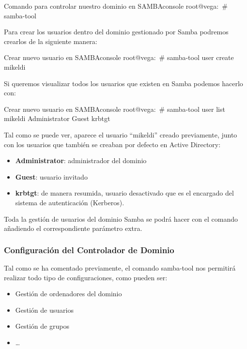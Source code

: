 \begin{mycode}{Comando para controlar nuestro dominio en SAMBA}{console}{}
root@vega:~# samba-tool
\end{mycode}

Para crear los usuarios dentro del dominio gestionado por Samba podremos crearlos de la siguiente manera:

\begin{mycode}{Crear nuevo usuario en SAMBA}{console}{}
root@vega:~# samba-tool user create mikeldi
\end{mycode}

Si queremos visualizar todos los usuarios que existen en Samba podemos hacerlo con:

\begin{mycode}{Crear nuevo usuario en SAMBA}{console}{}
root@vega:~# samba-tool user list
mikeldi
Administrator
Guest
krbtgt
\end{mycode}

Tal como se puede ver, aparece el usuario “mikeldi” creado previamente, junto con los usuarios que también se creaban por defecto en Active Directory:

\begin{itemize}
    \item \textbf{Administrator}: administrador del dominio
    \item \textbf{Guest}: usuario invitado
    \item \textbf{krbtgt}: de manera resumida, usuario desactivado que es el encargado del sistema de autenticación (Kerberos).
\end{itemize}


Toda la gestión de usuarios del dominio Samba se podrá hacer con el comando   añadiendo el correspondiente parámetro extra.




\subsubsection{Configuración del Controlador de Dominio}
Tal como se ha comentado previamente, el comando  samba-tool  nos permitirá realizar todo tipo de configuraciones, como pueden ser:
\begin{itemize}
    \item Gestión de ordenadores del dominio
    \item Gestión de usuarios
    \item Gestión de grupos
    \item …
\end{itemize}


